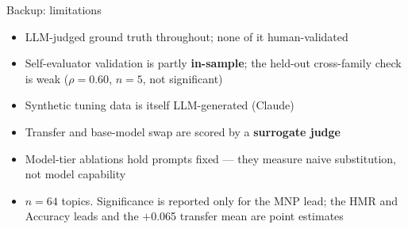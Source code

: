 \documentclass[aspectratio=169,11pt]{beamer}
\newcommand{\HMR}{\textsc{HMR}}
\newcommand{\MNP}{\textsc{MNP}}
\begin{document}
\begin{frame}{Backup: limitations}
\begin{itemize}\setlength\itemsep{0.4em}
  \item LLM-judged ground truth throughout; none of it human-validated
  \item Self-evaluator validation is partly \textbf{in-sample}; the held-out
        cross-family check is weak ($\rho{=}0.60$, $n{=}5$, not significant)
  \item Synthetic tuning data is itself LLM-generated (Claude)
  \item Transfer and base-model swap are scored by a \textbf{surrogate judge}
  \item Model-tier ablations hold prompts fixed --- they measure naive substitution,
        not model capability
  \item $n=64$ topics. Significance is reported only for the \MNP{} lead; the \HMR{}
        and Accuracy leads and the $+$0.065 transfer mean are point estimates
\end{itemize}
\end{frame}
\end{document}
